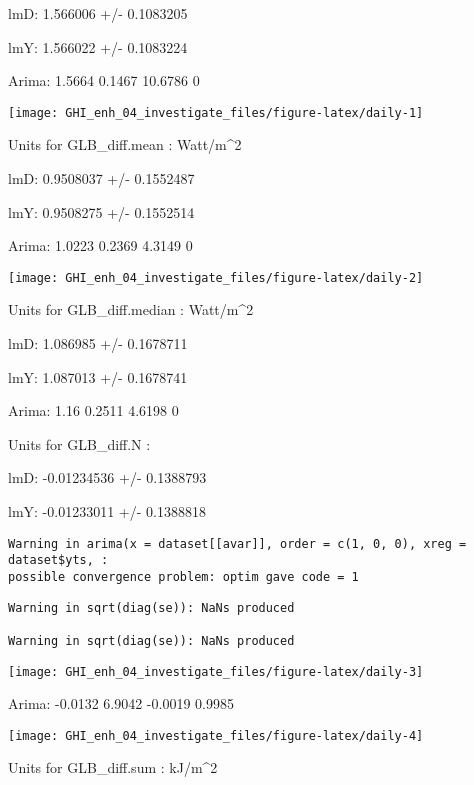 \documentclass[
  10pt,
  a4paper,oneside]{article}
\begin{document}
lmD: 1.566006 +/- 0.1083205

lmY: 1.566022 +/- 0.1083224

Arima: 1.5664 0.1467 10.6786 0

\begin{center}\texttt{[image: GHI\_enh\_04\_investigate\_files/figure-latex/daily-1]} \end{center}

Units for GLB\_diff.mean : Watt/m\^{}2

lmD: 0.9508037 +/- 0.1552487

lmY: 0.9508275 +/- 0.1552514

Arima: 1.0223 0.2369 4.3149 0

\begin{center}\texttt{[image: GHI\_enh\_04\_investigate\_files/figure-latex/daily-2]} \end{center}

Units for GLB\_diff.median : Watt/m\^{}2

lmD: 1.086985 +/- 0.1678711

lmY: 1.087013 +/- 0.1678741

Arima: 1.16 0.2511 4.6198 0

Units for GLB\_diff.N :

lmD: -0.01234536 +/- 0.1388793

lmY: -0.01233011 +/- 0.1388818

\begin{verbatim}
Warning in arima(x = dataset[[avar]], order = c(1, 0, 0), xreg = dataset$yts, :
possible convergence problem: optim gave code = 1
\end{verbatim}

\begin{verbatim}
Warning in sqrt(diag(se)): NaNs produced

Warning in sqrt(diag(se)): NaNs produced
\end{verbatim}

\begin{center}\texttt{[image: GHI\_enh\_04\_investigate\_files/figure-latex/daily-3]} \end{center}

Arima: -0.0132 6.9042 -0.0019 0.9985

\begin{center}\texttt{[image: GHI\_enh\_04\_investigate\_files/figure-latex/daily-4]} \end{center}

Units for GLB\_diff.sum : kJ/m\^{}2
\end{document}

